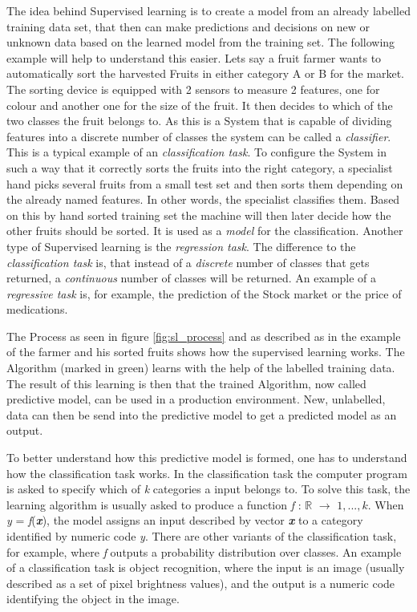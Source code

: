 \documentclass[12pt,oneside,a4paper,parskip]{scrbook}
\newcommand{\R}{\mathbb{R}}
\begin{document}
The idea behind Supervised learning is to create a model from an already labelled training data set, that then can make 
predictions and decisions on new or unknown data based on the learned model from the training set. 
The following example will help to understand this easier.
Lets say a fruit farmer wants to automatically sort the harvested Fruits in either category A or B for the market. 
The sorting device is equipped with 2 sensors to measure 2 features, one for colour and another one for the size of the 
fruit. It then decides to which of the two classes the fruit belongs to. As this is a System that is capable of dividing 
features into a discrete number of classes the system can be called a \textit{classifier}. 
This is a typical example of an \textit{classification task}.
To configure the System in such a way that it correctly sorts the fruits into the right category, 
a specialist hand picks several fruits from a small test set and then sorts them depending on the already named features. 
In other words, the specialist classifies them. Based on this by hand sorted training set the machine will then later 
decide how the other fruits should be sorted. It is used as a \textit{model} for the classification. \cite{IntroAI}
Another type of Supervised learning is the \textit{regression task}. The difference to the \textit{classification task} is, 
that instead of a \textit{discrete} number of classes that gets returned, a \textit{continuous} number of classes will be 
returned. An example of a \textit{regressive task} is, for example, the prediction of the Stock market or the price of 
medications.

The Process as seen in figure \ref{fig:sl_process} and as described as in the example of the farmer and his sorted 
fruits shows how the supervised learning works. The Algorithm (marked in green) learns with the help of the labelled 
training data. The result of this learning is then that the trained Algorithm, now called predictive model, 
can be used in a production environment.
New, unlabelled, data can then be send into the predictive model to get a predicted model as an output. \cite{PythonML}

To better understand how this predictive model is formed, one has to understand how the classification task works. 
In the classification task the computer program is asked to specify which of \textit{k} categories a input belongs to. 
To solve this task, the learning algorithm is usually asked to produce a function \textit{f} : $\R{}$ $\rightarrow$ ${1,...,k}$. 
When \textit{y} = \textit{f}(\textit{\textbf{x}}), the model assigns an input described by vector \textit{\textbf{x}} to a 
category identiﬁed by numeric code \textit{y}.
There are other variants of the classiﬁcation task, for example, where \textit{f} outputs a probability distribution over 
classes. An example of a classiﬁcation task is object recognition, where the input is an image (usually described as a set 
of pixel brightness values), and the output is a numeric code identifying the object in the image. \cite{Goodfellow-et-al-2016}
\end{document}

